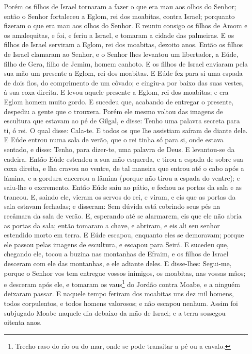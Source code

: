 Porém os filhos de Israel tornaram a fazer o que era mau aos
olhos do Senhor; então o Senhor fortaleceu a Eglom, rei dos
moabitas, contra Israel; porquanto fizeram o que era mau aos olhos
do Senhor. E reuniu consigo os filhos de Amom e os
amalequitas, e foi, e feriu a Israel, e tomaram a cidade das
palmeiras. E os filhos de Israel serviram a Eglom, rei dos
moabitas, dezoito anos. Então os filhos de Israel clamaram ao
Senhor, e o Senhor lhes levantou um libertador, a Eúde, filho de
Gera, filho de Jemim, homem canhoto. E os filhos de Israel enviaram
pela sua mão um presente a Eglom, rei dos moabitas. E Eúde
fez para si uma espada de dois fios, do comprimento de um côvado; e
cingiu-a por baixo das suas vestes, à sua coxa direita. E
levou aquele presente a Eglom, rei dos moabitas; e era Eglom homem
muito gordo. E sucedeu que, acabando de entregar o presente,
despediu a gente que o trouxera. Porém ele mesmo voltou das
imagens de escultura que estavam ao pé de Gilgal, e disse: Tenho uma
palavra secreta para ti, ó rei. O qual disse: Cala-te. E todos os
que lhe assistiam saíram de diante dele. E Eúde entrou numa
sala de verão, que o rei tinha só para si, onde estava sentado, e
disse: Tenho, para dizer-te, uma palavra de Deus. E levantou-se da
cadeira. Então Eúde estendeu a sua mão esquerda, e tirou a
espada de sobre sua coxa direita, e lha cravou no ventre, de
tal maneira que entrou até o cabo após a lâmina, e a gordura
encerrou a lâmina (porque não tirou a espada do ventre); e saiu-lhe
o excremento. Então Eúde saiu ao pátio, e fechou as portas da
sala e as trancou. E, saindo ele, vieram os servos do rei, e
viram, e eis que as portas da sala estavam fechadas; e disseram: Sem
dúvida está cobrindo seus pés na recâmara da sala de verão.
E, esperando até se alarmarem, eis que ele não abria as
portas da sala; então tomaram a chave, e abriram, e eis ali seu
senhor estendido morto em terra. E Eúde escapou, enquanto
eles se demoravam; porque ele passou pelas imagens de escultura, e
escapou para Seirá. E sucedeu que, chegando ele, tocou a
buzina nas montanhas de Efraim, e os filhos de Israel desceram com
ele das montanhas, e ele adiante deles. E disse-lhes:
Segui-me, porque o Senhor vos tem entregue vossos inimigos, os
moabitas, nas vossas mãos; e desceram após ele, e tomaram os
vaus\footnote{Trecho raso do rio ou do mar, onde se pode transitar a
pé ou a cavalo.} do Jordão contra Moabe, e a ninguém deixaram
passar. E naquele tempo feriram dos moabitas uns dez mil
homens, todos corpulentos, e todos homens valorosos; e não escapou
nenhum. Assim foi subjugado Moabe naquele dia debaixo da mão
de Israel; e a terra sossegou oitenta anos.

